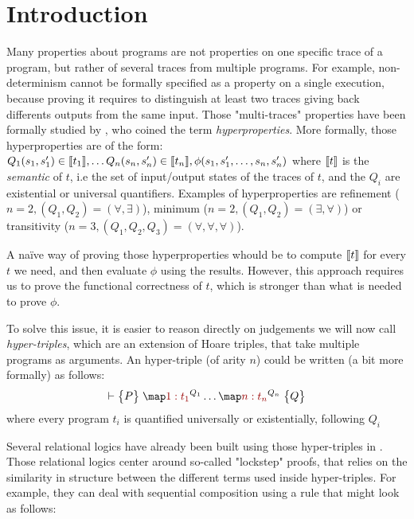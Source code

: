 \section{Introduction}
\label{sec:intro}

Many properties about programs are not properties on one specific trace of a program, but rather of several traces from multiple programs. For example, non-determinism cannot be formally specified as a property on a single execution, because proving it requires to distinguish at least two traces giving back differents outputs from the same input. Those "multi-traces" properties have been formally studied by \citet{ClarksonS08}, who coined the term \emph{hyperproperties}.
More formally, those hyperproperties are of the form:
\(
    Q_1 (s_1, s'_1) \in \sem{t_1},
    \dots
    Q_n (s_n, s'_n) \in \sem{t_n},
    \phi(s_1, s'_1, \dots, s_n, s'_n)
\)
where $\sem{t}$ is the \emph{semantic} of $t$, i.e the set of input/output states of the traces of $t$, and the $Q_i$ are existential or universal quantifiers. Examples of hyperproperties are refinement ($n = 2, (Q_1, Q_2) = (\forall, \exists)$), minimum ($n = 2, (Q_1, Q_2) = (\exists, \forall)$) or transitivity ($n = 3, (Q_1, Q_2, Q_3) = (\forall, \forall, \forall)$).

A naïve way of proving those hyperproperties whould be to compute $\sem{t}$ for every $t$ we need, and then evaluate $\phi$ using the results. However, this approach requires us to prove the functional correctness of $t$, which is stronger than what is needed to prove $\phi$.

To solve this issue, it is easier to reason directly on judgements we will now call \emph{hyper-triples}, which are an extension of Hoare triples, that take multiple programs as arguments. An hyper-triple (of arity $n$) could be written (a bit more formally) as follows:
\[
    \J |- {P} {\m[\I 1: t_1]^{Q_1} \dots \m[\I n: t_n]^{Q_n}} {Q}    
\]
where every program $t_i$ is quantified universally or existentially, following $Q_i$

Several relational logics have already been built using those hyper-triples in \cite{Yang07, SousaD16, Benton04, BartheCK16}. Those relational logics center around so-called "lockstep" proofs, that relies on the similarity in structure between the different terms used inside hyper-triples. For example, they can deal with sequential composition using a rule that might look as follows:

\begin{prooftree}
\end{prooftree}

